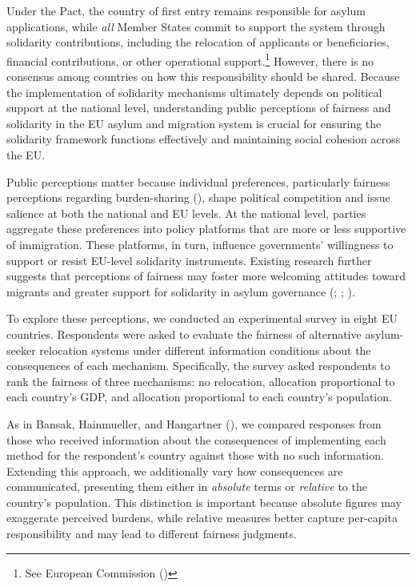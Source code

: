 \documentclass[
  12pt,
  a4paper,
]{article}
\begin{document}
Under the Pact, the country of first entry remains responsible for asylum applications, while \emph{all} Member States commit to support the system through solidarity contributions, including the relocation of applicants or beneficiaries, financial contributions, or other operational support.\footnote{See European Commission ()} However, there is no consensus among countries on how this responsibility should be shared. Because the implementation of solidarity mechanisms ultimately depends on political support at the national level, understanding public perceptions of fairness and solidarity in the EU asylum and migration system is crucial for ensuring the solidarity framework functions effectively and maintaining social cohesion across the EU.

Public perceptions matter because individual preferences, particularly fairness perceptions regarding burden-sharing (), shape political competition and issue salience at both the national and EU levels. At the national level, parties aggregate these preferences into policy platforms that are more or less supportive of immigration. These platforms, in turn, influence governments' willingness to support or resist EU-level solidarity instruments. Existing research further suggests that perceptions of fairness may foster more welcoming attitudes toward migrants and greater support for solidarity in asylum governance (; ; ).

To explore these perceptions, we conducted an experimental survey in eight EU countries. Respondents were asked to evaluate the fairness of alternative asylum-seeker relocation systems under different information conditions about the consequences of each mechanism. Specifically, the survey asked respondents to rank the fairness of three mechanisms: no relocation, allocation proportional to each country's GDP, and allocation proportional to each country's population.

As in Bansak, Hainmueller, and Hangartner (), we compared responses from those who received information about the consequences of implementing each method for the respondent's country against those with no such information. Extending this approach, we additionally vary how consequences are communicated, presenting them either in \emph{absolute} terms or \emph{relative} to the country's population. This distinction is important because absolute figures may exaggerate perceived burdens, while relative measures better capture per-capita responsibility and may lead to different fairness judgments.
\end{document}
